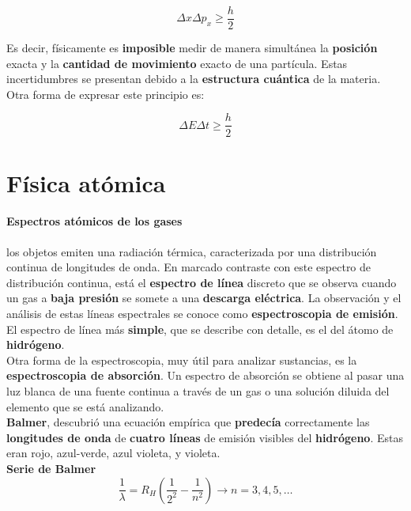 \documentclass[10pt]{article}
\begin{document}
\begin{equation*}
	\Delta x \Delta p_x \geq \dfrac{h}{2}
\end{equation*}

Es decir, físicamente es \textbf{imposible} medir de manera simultánea la \textbf{posición} exacta y la \textbf{cantidad de movimiento} exacto de una partícula. Estas incertidumbres se presentan debido a la \textbf{estructura cuántica} de la materia.\\
\linebreak
Otra forma de expresar este principio es:

\begin{equation*}
	\Delta E \Delta t \geq \dfrac{h}{2}
\end{equation*}

\section{Física atómica}

\paragraph{Espectros atómicos de los gases}

los objetos emiten una radiación térmica, caracterizada por una distribución continua de longitudes de onda. En marcado contraste con este espectro de distribución continua, está el \textbf{espectro de línea} discreto que se observa cuando un gas a \textbf{baja presión} se somete a una \textbf{descarga eléctrica}. La observación y el análisis de estas líneas espectrales se conoce como \textbf{espectroscopia de emisión}. El espectro de línea más \textbf{simple}, que se describe con detalle, es el del átomo de \textbf{hidrógeno}.\\
\linebreak
Otra forma de la espectroscopia, muy útil para analizar sustancias, es la \textbf{espectroscopia de absorción}. Un espectro de absorción se obtiene al pasar una luz blanca de una fuente continua a través de un gas o una solución diluida del elemento que se está analizando.\\
\linebreak
\textbf{Balmer}, descubrió una ecuación empírica que \textbf{predecía} correctamente las \textbf{longitudes de onda} de \textbf{cuatro líneas} de emisión visibles del \textbf{hidrógeno}. Estas eran rojo, azul-verde, azul violeta, y violeta.\\
\linebreak
\textbf{Serie de Balmer}
\begin{equation*}
	\dfrac{1}{\lambda} = R_H \left( \dfrac{1}{2^2}- \dfrac{1}{n^2}  \right) \rightarrow n = 3,4,5,\dots
\end{equation*}
\end{document}
